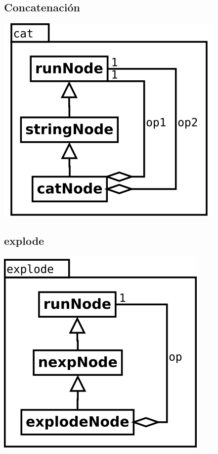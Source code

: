 \subsection {Concatenación}
\begin{center}
\includegraphics[scale=0.4]{cat.png} \\
\end{center}

\subsection {explode}
\begin{center}
\includegraphics[scale=0.4]{explode.png} \\
\end{center}

